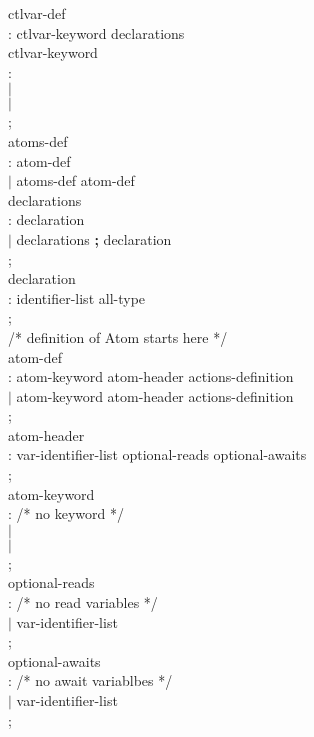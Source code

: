 \begin{tab}
\begin{tabbing}
ctlvar-def \\
\>: ctlvar-keyword  declarations \\

ctlvar-keyword \\
\>: \PRIVATE \\
\>$|$ \INTERFACE \\
\>$|$ \EXTERNAL \\
\>; \\

atoms-def \\
\>: atom-def \\
\>$|$ atoms-def atom-def \\

declarations \\
\>: declaration \\
\>$|$ declarations {\bf ;} declaration \\
\>; \\

declaration \\
\>: identifier-list \COLON all-type \\
\>; \\

/* definition of Atom starts here */ \\

atom-def \\
\>: atom-keyword \ATOM atom-header actions-definition \ENDATOM \\
\>$|$ atom-keyword \ATOM \ATOMID atom-header actions-definition
\ENDATOM \\
\>; \\

atom-header \\
\>: \CONTROLS var-identifier-list optional-reads optional-awaits \\
\>; \\

atom-keyword \\
\>: /* no keyword */  \\
\>$|$ \LAZY \\
\>$|$ \EVENT \\
\>; \\

optional-reads \\
\>: /* no read variables */ \\
\>$|$ \READS var-identifier-list \\
\>; \\

optional-awaits \\
\>: /* no await variablbes */ \\
\>$|$ \AWAITS var-identifier-list \\
\>; \\


\end{tabbing}
\end{tab}
